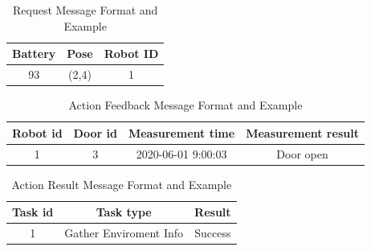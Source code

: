\begin{table}[htb]
\centering
\begin{tabular}{|c|c|c|} 
\hline
Battery & Pose & Robot ID\\
\hline\hline
93	&(2,4)	&1 \\ [1ex] 
\hline
\end{tabular}
\caption{Request Message Format and Example}
\label{tab:request_message}
\end{table}

\begin{table}[htb]
\centering
{}
\caption{Action Goal Message Format and Example}
\label{tab:goal_message}
\end{table}

\begin{table}[htb]
\centering
\begin{tabular}{|c|c|c|c|} 
\hline
Robot id & Door id & Measurement time & Measurement result \\
\hline\hline
1	& 3	& 2020-06-01 9:00:03 & Door open \\ [1ex] 
\hline
\end{tabular}
\caption{Action Feedback Message Format and Example}
\label{tab:feedback_message}
\end{table}

\begin{table}[htb]
\centering
\begin{tabular}{|c|c|c|} 
\hline
Task id	& Task type	& Result\\
\hline\hline
1 & Gather Enviroment Info & Success \\ [1ex] 
\hline
\end{tabular}
\caption{Action Result Message Format and Example}
\label{tab:result_message}
\end{table}


